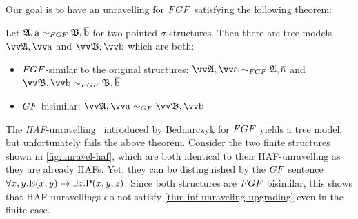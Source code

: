Our goal is to have an unravelling for $\FGF$ satisfying the following theorem:
\begin{theorem}\label{thm:inf-unraveling-upgrading}
  Let $\str{A}, \elemtuplea \bisimto_{\FGF} \str{B}, \elemtupleb$ for two pointed $\sigma$-structures.
  Then there are tree models $\unravel{A}, \elemtuptuplea$ and $\unravel{B}, \elemtuptupleb$ which are both:
  \begin{itemize}
    \item $\FGF$-similar to the original structures: $\unravel{A}, \elemtuptuplea \bisimto_{\FGF} \str{A}, \elemtuplea$ and $\unravel{B}, \elemtuptupleb \bisimto_{\FGF} \str{B}, \elemtupleb$
    \item $\GF$-bisimilar: $\unravel{A}, \elemtuptuplea \bisimto_{\GF} \unravel{B}, \elemtuptupleb$
  \end{itemize}
\end{theorem}
The \emph{HAF}-unravelling~\cite[Sec 3.3]{Bednarczyk21} introduced by Bednarczyk for $\FGF$ yields a tree model, but unfortunately fails the above theorem.
Consider the two finite structures shown in \cref{fig:unravel-haf}, which are both identical to their HAF-unravelling as they are already HAFs.
Yet, they can be distinguished by the $\GF$ sentence $\forall{x,y}. \mathrm{E}(x,y) \to \exists z. \mathrm{P}(x,y,z)$.
Since both structures are $\FGF$ bisimilar, this shows that HAF-unravellings do not satisfy \cref{thm:inf-unraveling-upgrading} even in the finite case.

